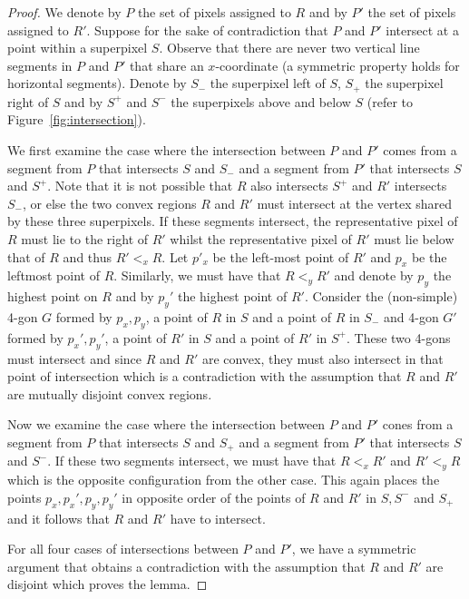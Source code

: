 \documentclass[a4paper,UKenglish,cleveref]{lipics-v2019}
\begin{document}
\begin{proof}
We denote by $P$ the set of pixels assigned to $R$ and by $P'$ the set of pixels assigned to $R'$. Suppose for the sake of contradiction that $P$ and $P'$ intersect at a point within a superpixel $S$. Observe that there are never two vertical line segments in $P$ and $P'$ that share an $x$-coordinate (a symmetric property holds for horizontal segments). Denote by $S_-$ the superpixel left of $S$, $S_+$ the superpixel right of $S$ and by $S^+$ and $S^-$ the superpixels above and below $S$ (refer to Figure~\ref{fig:intersection}). 

We first examine the case where the intersection between $P$ and $P'$ comes from a segment from $P$ that intersects $S$ and $S_-$ and a segment from $P'$ that intersects $S$ and $S^+$. Note that it is not possible that $R$ also intersects $S^+$ and $R'$ intersects $S_-$, or else the two convex regions $R$ and $R'$ must intersect at the vertex shared by these three superpixels. 
If these segments intersect, the representative pixel of $R$ must lie to the right of $R'$ whilst the representative pixel of $R'$ must lie below that of $R$ and thus $R' <_x R$. Let $p'_x$ be the left-most point of $R'$ and $p_x$ be the leftmost point of $R$. Similarly, we must have that $R <_y R'$ and denote by $p_y$ the highest point on $R$ and by $p_y'$ the highest point of $R'$. Consider the (non-simple) 4-gon $G$ formed by $p_x, p_y$, a point of $R$ in $S$ and a point of $R$ in $S_-$ and 4-gon $G'$ formed by $p_x', p_y'$, a point of $R'$ in $S$ and a point of $R'$ in $S^+$. These two 4-gons must intersect and since $R$ and $R'$ are convex, they must also intersect in that point of intersection which is a contradiction with the assumption that $R$ and $R'$ are mutually disjoint convex regions.

Now we examine the case where the intersection between $P$ and $P'$ cones from a segment from $P$ that intersects $S$ and $S_+$ and a segment from $P'$ that intersects $S$ and $S^-$. If these two segments intersect, we must have that $R <_x R'$ and $R' <_y R$ which is the opposite configuration from the other case. This again places the points $p_x, p_x', p_y, p_y'$ in opposite order of the points of $R$ and $R'$ in $S, S^-$ and $S_+$ and it follows that $R$ and $R'$ have to intersect.

For all four cases of intersections between $P$ and $P'$, we have a symmetric argument that obtains a contradiction with the assumption that $R$ and $R'$ are disjoint which proves the lemma. 
\end{proof}
\end{document}
